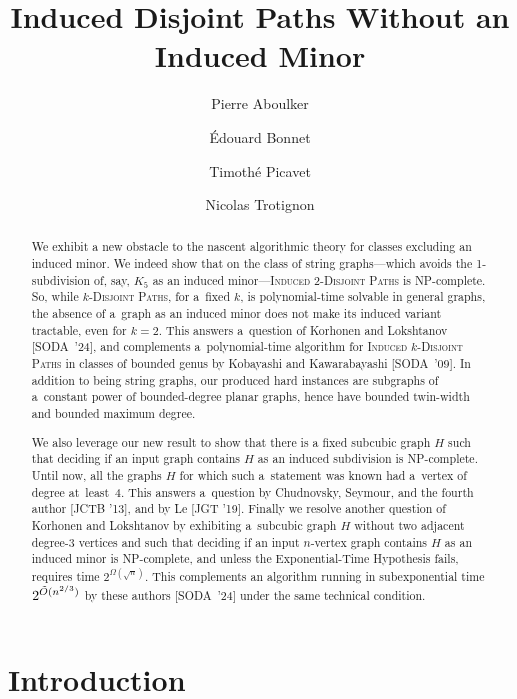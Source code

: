 \documentclass[a4paper,UKenglish,cleveref,autoref]{lipics-v2021}
\title{Induced Disjoint Paths Without an Induced Minor}
\author{Pierre Aboulker}{DIENS, \'Ecole normale sup\'erieure, CNRS, PSL University, Paris, France \and \url{https://www.di.ens.fr/~paboulker/} }{pierreaboulker@gmail.com}{}{}
\author{\'{E}douard Bonnet}{CNRS, ENS de Lyon, Université Claude Bernard Lyon 1, LIP UMR 5668, Lyon, France \and \url{http://perso.ens-lyon.fr/edouard.bonnet}}{edouard.bonnet@ens-lyon.fr}{https://orcid.org/0000-0002-1653-5822}{}
\author{Timothé Picavet}{LaBRI, Université de Bordeaux, France}{timothe.picavet@u-bordeaux.fr}{https://orcid.org/0000-0002-7129-0127}{}
\author{Nicolas Trotignon}{CNRS, ENS de Lyon, Université Claude Bernard Lyon 1, LIP UMR 5668, Lyon, France \and \url{http://perso.ens-lyon.fr/nicolas.trotignon}}{nicolas.trotignon@ens-lyon.fr}{}{}
\begin{document}
\maketitle

\begin{abstract}
  We exhibit a new obstacle to the nascent algorithmic theory for classes excluding an induced minor.
  We indeed show that on the class of string graphs---which avoids the 1-subdivision of, say, $K_5$ as an induced minor---\textsc{Induced 2-Disjoint Paths} is NP-complete.
  So, while \textsc{$k$-Disjoint Paths}, for a~fixed $k$, is polynomial-time solvable in general graphs, the absence of a~graph as an induced minor does not make its induced variant tractable, even for $k=2$.
  This answers a~question of Korhonen and Lokshtanov [SODA~'24], and complements a~polynomial-time algorithm for \textsc{Induced $k$-Disjoint Paths} in classes of bounded genus by Kobayashi and Kawarabayashi [SODA~'09].
  In addition to being string graphs, our produced hard instances are subgraphs of a~constant power of bounded-degree planar graphs, hence have bounded twin-width and bounded maximum degree.
  
  We also leverage our new result to show that there is a fixed subcubic graph $H$ such that deciding if an input graph contains $H$ as an induced subdivision is NP-complete.
  Until now, all the graphs $H$ for which such a~statement was known had a~vertex of degree at~least~4.
  This answers a~question by Chudnovsky, Seymour, and the fourth author [JCTB '13], and by Le [JGT '19].
  Finally we resolve another question of Korhonen and Lokshtanov by exhibiting a~subcubic graph $H$ without two adjacent degree-3 vertices and such that deciding if an input $n$-vertex graph contains $H$ as an induced minor is NP-complete, and unless the Exponential-Time Hypothesis fails, requires time $2^{\Omega(\sqrt n)}$.
  This complements an algorithm running in subexponential time $2^{\Tilde{O}(n^{2/3})}$ by these authors [SODA~'24] under the same technical condition.
  \end{abstract}

\section{Introduction}\label{sec:intro}
\end{document}
